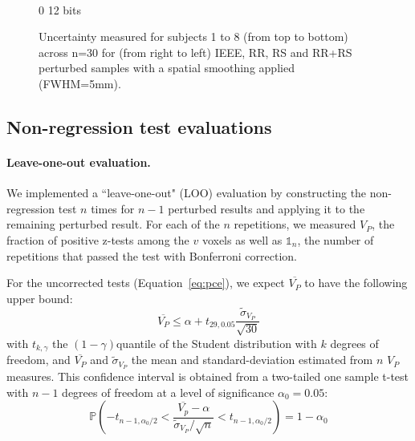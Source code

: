 \documentclass{article}
\begin{document}
\begin{landscape}
\begin{figure}
\begin{subfigure}[t]{0.2\paperheight}
        \end{subfigure} \\
        \hspace*{6cm} 0  12 bits
        \caption{Uncertainty measured for subjects 1 to 8 (from top to bottom) across n=30 for
            (from right to left) IEEE, RR, RS and RR+RS perturbed samples with a spatial smoothing applied (FWHM=5mm). }
        \label{fig:uncertainty_sub_1}

    \end{figure}
\end{landscape}


\subsection{Non-regression test evaluations}

\paragraph{Leave-one-out evaluation.} We implemented a ``leave-one-out" (LOO)
evaluation by constructing the non-regression test $n$ times for $n-1$ perturbed results
and applying it to the remaining perturbed result. For each of the $n$ repetitions,
we measured $V_P$, the fraction of
positive z-tests among the $v$ voxels as well as $\mathds{1}_n$, the number of repetitions
that passed the test with Bonferroni correction.

For the uncorrected tests (Equation~\ref{eq:pce}), we expect $\overline{V_P}$ to have
the following upper bound:
\[
    \overline{V_P} \leq
    \alpha  + t_{29,0.05} \frac{\tilde{\sigma}_{V_P}}{\sqrt{30}}
\]
with
$t_{k,\gamma}$ the $(1-\gamma)$quantile of the Student distribution with $k$ degrees of freedom,
and $\overline{V_P}$ and $\tilde{\sigma}_{V_P}$ the mean and standard-deviation estimated from
$n$ $V_P$ measures.
This confidence interval is obtained from a two-tailed one sample
t-test with $n-1$ degrees of freedom at a level of significance $\alpha_0=0.05$:
\[
    \mathbb{P}
    \left(
    -t_{n-1,\alpha_0/2}
    <
    \dfrac{\overline{V_p} - \alpha}{\tilde{\sigma}_{V_P} / \sqrt{n}}
    <
    t_{n-1,\alpha_0/2}
    \right)
    = 1 - \alpha_0
\]

\end{document}
